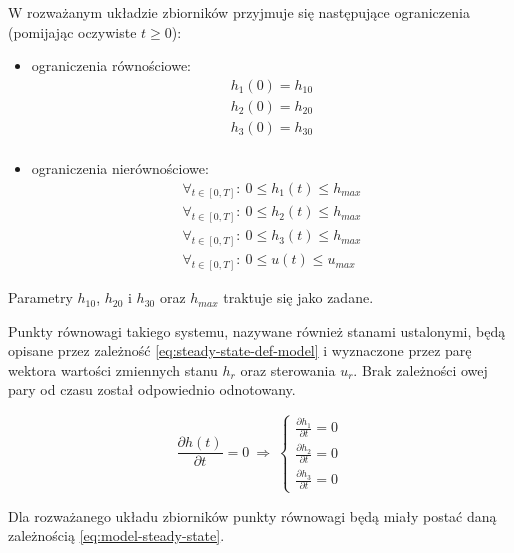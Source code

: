 W rozważanym układzie zbiorników przyjmuje się następujące ograniczenia (pomijając oczywiste $t \geq 0$):
\begin{itemize}
    \item ograniczenia równościowe:
    \begin{equation}\label{eq:model-eq-const}
    \begin{array}{lr}
        h_{1}(0) = h_{10}\\
        h_{2}(0) = h_{20}\\
        h_{3}(0) = h_{30}\\
    \end{array}
    \end{equation}
    \item ograniczenia nierównościowe:
    \begin{equation}\label{eq:model-noneq-const}
    \begin{array}{lr}
        \forall_{t \in [0, T]}:~ 0 \leq h_{1}(t) \leq h_{max}\\
        \forall_{t \in [0, T]}:~ 0 \leq h_{2}(t) \leq h_{max}\\
        \forall_{t \in [0, T]}:~ 0 \leq h_{3}(t) \leq h_{max}\\
        \forall_{t \in [0, T]}:~ 0 \leq u(t) \leq u_{max}
    \end{array}
    \end{equation}
\end{itemize}
Parametry $h_{10}$, $h_{20}$ i $h_{30}$ oraz $h_{max}$ traktuje się jako zadane.

Punkty równowagi takiego systemu, nazywane również stanami ustalonymi, będą opisane przez zależność \ref{eq:steady-state-def-model} i wyznaczone przez parę wektora wartości zmiennych stanu $h_{r}$ oraz sterowania $u_{r}$. Brak zależności owej pary od czasu został odpowiednio odnotowany.

\begin{equation}\label{eq:steady-state-def-model}
\frac{\partial h(t)}{\partial t} = 0 ~\Rightarrow~ 
\left \{
\begin{array}{lr}
    \frac{\partial h_{1}}{\partial t} = 0 \\
    \frac{\partial h_{2}}{\partial t} = 0 \\
    \frac{\partial h_{3}}{\partial t} = 0
\end{array}
\right.
\end{equation}

Dla rozważanego układu zbiorników punkty równowagi będą miały postać daną zależnością \ref{eq:model-steady-state}.

